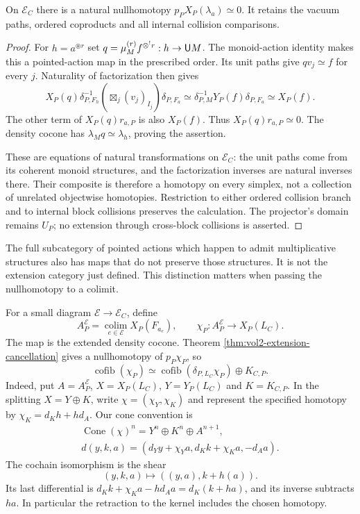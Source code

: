 \begin{theorem}\label{thm:vol2-extension-cancellation}
On $\mathscr E_C$ there is a natural nullhomotopy
$p_PX_P(\lambda_a)\simeq0$. It retains the vacuum paths,
ordered coproducts and all internal collision comparisons.
\end{theorem}
\begin{proof}
For $h=a^{\circledast r}$ set
$q=\mu_M^{(r)}f^{\mathbin{\otimes^!} r}:h\to\mathsf U M$.
The monoid-action identity makes this a pointed-action
map in the prescribed order. Its unit paths give
$qv_j\simeq f$ for every $j$. Naturality of factorization
then gives
\[
 X_P(q)\delta_{P,F_h}^{-1}
       \left(\boxtimes_j(v_j)_{I_j}\right)\delta_{P,F_a}
 \simeq\delta_{P,M}^{-1}Y_P(f)\delta_{P,F_a}
 \simeq X_P(f).
\]
The other term of $X_P(q)r_{a,P}$ is also $X_P(f)$.
Thus $X_P(q)r_{a,P}\simeq0$. The density cocone has
$\lambda_Mq\simeq\lambda_h$, proving the assertion.

These are equations of natural transformations on
$\mathscr E_C$: the unit paths come from its coherent
monoid structures, and the factorization inverses are
natural inverses there. Their composite is therefore
a homotopy on every simplex, not a collection of
unrelated objectwise homotopies. Restriction to either
ordered collision branch and to internal block collisions
preserves the calculation. The projector's domain remains
$U_P$; no extension through cross-block collisions is asserted.
\end{proof}

The full subcategory of pointed actions which happen to
admit multiplicative structures also has maps that do
not preserve those structures. It is not the extension
category just defined. This distinction matters when
passing the nullhomotopy to a colimit.

For a small diagram $\mathscr E\to\mathscr E_C$, define
\[
 A_P^{\mathscr E}=\operatorname*{colim}_{e\in\mathscr E}
                       X_P(F_{a_e}),\qquad
 \chi_P:A_P^{\mathscr E}\longrightarrow X_P(L_C).
\]
The map is the extended density cocone. Theorem
\ref{thm:vol2-extension-cancellation} gives a nullhomotopy
of $p_P\chi_P$, so
\begin{equation}\label{eq:vol2-relative-kernel}
 \operatorname{cofib}(\chi_P)\simeq
 \operatorname{cofib}(\delta_{P,L_C}\chi_P)\oplus K_{C,P}.
\end{equation}
Indeed, put $A=A_P^{\mathscr E}$, $X=X_P(L_C)$,
$Y=Y_P(L_C)$ and $K=K_{C,P}$. In the splitting $X=Y\oplus K$, write
$\chi=(\chi_Y,\chi_K)$ and represent the specified
homotopy by $\chi_K=d_Kh+hd_A$. Our cone convention is
\[
\begin{gathered}
 \operatorname{Cone}(\chi)^n=Y^n\oplus K^n\oplus A^{n+1},\\
 d(y,k,a)=(d_Yy+\chi_Ya,d_Kk+\chi_Ka,-d_Aa).
\end{gathered}
\]
The cochain isomorphism is the shear
\begin{equation}\label{eq:vol2-cone-shear}
 (y,k,a)\longmapsto((y,a),k+h(a)).
\end{equation}
Its last differential is
$d_Kk+\chi_Ka-hd_Aa=d_K(k+ha)$, and its inverse subtracts
$ha$. In particular the retraction to the kernel includes
the chosen homotopy.

